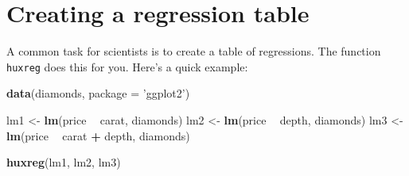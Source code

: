 \documentclass[]{article}
\newenvironment{Shaded}{\begin{snugshade}}{\end{snugshade}}
\newcommand{\DataTypeTok}[1]{\textcolor[rgb]{0.13,0.29,0.53}{#1}}
\newcommand{\KeywordTok}[1]{\textcolor[rgb]{0.13,0.29,0.53}{\textbf{#1}}}
\newcommand{\NormalTok}[1]{#1}
\newcommand{\OperatorTok}[1]{\textcolor[rgb]{0.81,0.36,0.00}{\textbf{#1}}}
\newcommand{\StringTok}[1]{\textcolor[rgb]{0.31,0.60,0.02}{#1}}
\begin{document}
\FloatBarrier

\hypertarget{creating-a-regression-table}{%
\section{Creating a regression
table}\label{creating-a-regression-table}}

A common task for scientists is to create a table of regressions. The
function \texttt{huxreg} does this for you. Here's a quick example:

\begin{Shaded}
\begin{Highlighting}[]
\KeywordTok{data}\NormalTok{(diamonds, }\DataTypeTok{package =} \StringTok{'ggplot2'}\NormalTok{)}

\NormalTok{lm1 <-}\StringTok{ }\KeywordTok{lm}\NormalTok{(price }\OperatorTok{~}\StringTok{ }\NormalTok{carat, diamonds)}
\NormalTok{lm2 <-}\StringTok{ }\KeywordTok{lm}\NormalTok{(price }\OperatorTok{~}\StringTok{ }\NormalTok{depth, diamonds)}
\NormalTok{lm3 <-}\StringTok{ }\KeywordTok{lm}\NormalTok{(price }\OperatorTok{~}\StringTok{ }\NormalTok{carat }\OperatorTok{+}\StringTok{ }\NormalTok{depth, diamonds)}

\KeywordTok{huxreg}\NormalTok{(lm1, lm2, lm3)}
\end{Highlighting}
\end{Shaded}
\end{document}
